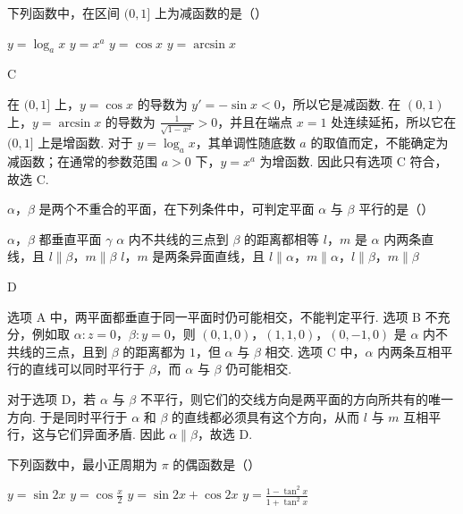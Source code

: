 \begin{problem}
下列函数中，在区间 \((0,1]\) 上为减函数的是（\quad）

\choices
    {\(y = \log_a x\)}
    {\(y = x^a\)}
    {\(y = \cos x\)}
    {\(y = \arcsin x\)}
\end{problem}

\begin{answer}
C
\end{answer}

\begin{solution}
在 \((0,1]\) 上，\(y=\cos x\) 的导数为 \(y'=-\sin x<0\)，所以它是减函数. 在 \((0,1)\) 上，\(y=\arcsin x\) 的导数为 \(\frac{1}{\sqrt{1-x^2}}>0\)，并且在端点 \(x=1\) 处连续延拓，所以它在 \((0,1]\) 上是增函数. 对于 \(y=\log_a x\)，其单调性随底数 \(a\) 的取值而定，不能确定为减函数；在通常的参数范围 \(a>0\) 下，\(y=x^a\) 为增函数. 因此只有选项 C 符合，故选 C.
\end{solution}

\begin{problem}
\(\alpha\)，\(\beta\) 是两个不重合的平面，在下列条件中，可判定平面 \(\alpha\) 与 \(\beta\) 平行的是（\quad）

\choices
    {\(\alpha\)，\(\beta\) 都垂直平面 \(\gamma\)}
    {\(\alpha\) 内不共线的三点到 \(\beta\) 的距离都相等}
    {\(l\)，\(m\) 是 \(\alpha\) 内两条直线，且 \(l \parallel \beta\)，\(m \parallel \beta\)}
    {\(l\)，\(m\) 是两条异面直线，且 \(l \parallel \alpha\)，\(m \parallel \alpha\)，\(l \parallel \beta\)，\(m \parallel \beta\)}
\end{problem}

\begin{answer}
D
\end{answer}

\begin{solution}
选项 A 中，两平面都垂直于同一平面时仍可能相交，不能判定平行. 选项 B 不充分，例如取 \(\alpha:z=0\)，\(\beta:y=0\)，则 \((0,1,0)\)，\((1,1,0)\)，\((0,-1,0)\) 是 \(\alpha\) 内不共线的三点，且到 \(\beta\) 的距离都为 \(1\)，但 \(\alpha\) 与 \(\beta\) 相交. 选项 C 中，\(\alpha\) 内两条互相平行的直线可以同时平行于 \(\beta\)，而 \(\alpha\) 与 \(\beta\) 仍可能相交.

对于选项 D，若 \(\alpha\) 与 \(\beta\) 不平行，则它们的交线方向是两平面的方向所共有的唯一方向. 于是同时平行于 \(\alpha\) 和 \(\beta\) 的直线都必须具有这个方向，从而 \(l\) 与 \(m\) 互相平行，这与它们异面矛盾. 因此 \(\alpha\parallel\beta\)，故选 D.
\end{solution}

\begin{problem}
下列函数中，最小正周期为 \(\pi\) 的偶函数是（\quad）

\choices
    {\(y = \sin 2x\)}
    {\(y = \cos \frac{x}{2}\)}
    {\(y = \sin 2x + \cos 2x\)}
    {\(y = \frac{1 - \tan^2 x}{1 + \tan^2 x}\)}
\end{problem}

